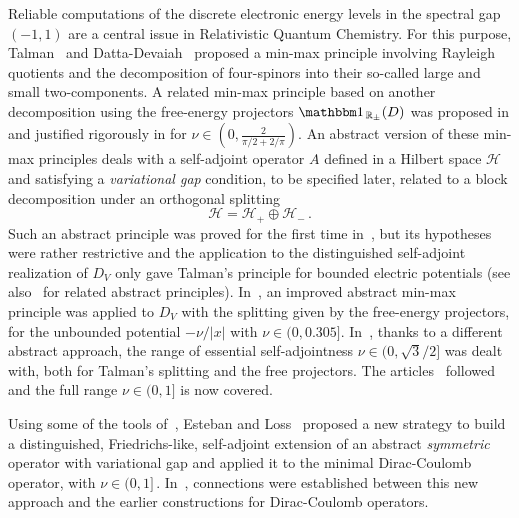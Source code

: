 \documentclass[12pt,reqno]{amsart}
\newcommand{\R}{{\mathbb R}}
\newcommand{\be}[1]{\begin{equation}\label{#1}}
\newcommand{\ee}{\end{equation}}
\renewcommand{\(}{\left(}
\renewcommand{\)}{\right)}
\begin{document}
Reliable computations of the discrete electronic energy levels in the spectral gap $(-1,1)$ are a central issue in Relativistic Quantum Chemistry. For this purpose, Talman~\cite{Talman-86} and Datta-Devaiah~\cite{datta1988minimax} proposed a min-max principle involving Rayleigh quotients and the decomposition of four-spinors into their so-called large and small two-components. A related min-max principle based on another decomposition using the free-energy projectors $\mathbbm 1_{\,\R_{\pm}}(D)$ was proposed in \cite{esteban1997existence} and justified rigorously in \cite{DES00b} for $\nu\in\left(0,\frac{2}{\pi/2+2/\pi}\right)$.
An abstract version of these min-max principles deals with a self-adjoint operator $A$ defined in a Hilbert space $\mathcal H\,$ and satisfying a {\it variational gap} condition, to be specified later, related to a block decomposition under an orthogonal splitting
\be{Orth}
\mathcal H=\mathcal H_+\oplus\mathcal H_-\,.
\ee
Such an abstract principle was proved for the first time in~\cite{GS99}, but its hypotheses were rather restrictive and the application to the distinguished self-adjoint realization of $D_V$ only gave Talman's principle for bounded electric potentials (see also~\cite{kraus2004variational,tretter2008spectral} for related abstract principles). In~\cite{Griesemer1999}, an improved abstract min-max principle was applied to $D_V$ with the splitting given by the free-energy projectors, for the unbounded potential $-\nu/|x|$ with $\nu\in(0,0.305]$. In~\cite{DES00a}, thanks to a different abstract approach, the range of essential self-adjointness $\nu\in(0,\sqrt{3}/{2}]$ was dealt with, both for Talman's splitting and the free projectors. The articles~\cite{MorMul-15, M16, ELS19, SST20, ELS21} followed and the full range $\nu\in(0,1]$ is now covered.

Using some of the tools of~\cite{DES00a}, Esteban and Loss~\cite{EstLos-07,EstLos-08} proposed a new strategy to build a distinguished, Friedrichs-like, self-adjoint extension of an abstract {\it symmetric} operator with variational gap and applied it to the minimal Dirac-Coulomb operator, with $\nu\in (0, 1]\,$. In~\cite{ELS19, ELS21}, connections were established between this new approach and the earlier constructions for Dirac-Coulomb operators.
 
\end{document}
